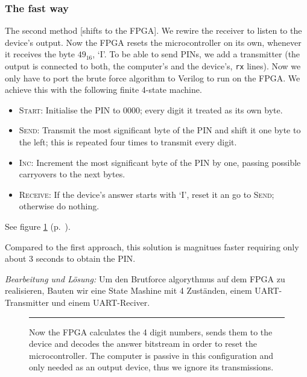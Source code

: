 \subsubsection*{The fast way}
The second method [shifts to the FPGA]. 
We rewire the receiver to listen to the device's output.
Now the FPGA resets the microcontroller on its own, whenever it receives the byte $49_{16}$, `I'. 
To be able to send PINs, we add a transmitter (the output is connected to both, the computer's and the device's, \texttt{rx} lines). Now we only have to port the brute force algorithm to Verilog to run on the FPGA. We achieve this with the following finite 4-state machine.

\begin{itemize}
    \item[]\textsc{Start}: Initialise the PIN to $0000$; every digit it treated as its own byte.
    \item[]\textsc{Send}: Transmit the most significant byte of the PIN and shift it one byte to the left; this is repeated four times to transmit every digit.
    \item[]\textsc{Inc}: Increment the most significant byte of the PIN by one, passing possible carryovers to the next bytes.
    \item[]\textsc{Receive}: If the device's answer starts with `I', reset it an go to \textsc{Send}; otherwise do nothing.
\end{itemize}

See figure \ref{fig:as4-schematic-2} (p.~\pageref{fig:as4-schematic-2}).

Compared to the first approach, this solution is magnitues faster requiring only about 3 seconds to obtain the PIN.

\emph{Bearbeitung und Lösung: }
Um den Brutforce algorythmus auf dem FPGA zu realisieren, Bauten wir eine State Mashine mit 4 Zuständen, einem UART-Transmitter und einem UART-Reciver.



\begin{figure}[tb]
    \begin{center}
        
        \caption{Now the FPGA calculates the 4 digit numbers, sends them to the device and decodes the answer bitstream in order to reset the microcontroller. The computer is passive in this configuration and only needed as an output device, thus we ignore its transmissions.}
        \label{fig:as4-schematic-2}
        \vspace{1em}\hrule
    \end{center}
\end{figure}


